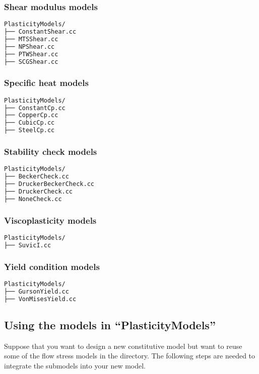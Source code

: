 \subsubsection{Shear modulus models}
\begin{lstlisting}[language=sh, backgroundcolor=\color{background}]
PlasticityModels/
├── ConstantShear.cc
├── MTSShear.cc
├── NPShear.cc
├── PTWShear.cc
├── SCGShear.cc
\end{lstlisting}

\subsubsection{Specific heat models}
\begin{lstlisting}[language=sh, backgroundcolor=\color{background}]
PlasticityModels/
├── ConstantCp.cc
├── CopperCp.cc
├── CubicCp.cc
├── SteelCp.cc
\end{lstlisting}

\subsubsection{Stability check models}
\begin{lstlisting}[language=sh, backgroundcolor=\color{background}]
PlasticityModels/
├── BeckerCheck.cc
├── DruckerBeckerCheck.cc
├── DruckerCheck.cc
├── NoneCheck.cc
\end{lstlisting}

\subsubsection{Viscoplasticity models}
\begin{lstlisting}[language=sh, backgroundcolor=\color{background}]
PlasticityModels/
├── SuvicI.cc
\end{lstlisting}

\subsubsection{Yield condition models}
\begin{lstlisting}[language=sh, backgroundcolor=\color{background}]
PlasticityModels/
├── GursonYield.cc
├── VonMisesYield.cc
\end{lstlisting}

\subsection{Using the models in ``PlasticityModels''}
Suppose that you want to design a new constitutive model 
but want to reuse some of the flow stress models in 
the  directory.
The following steps are needed to integrate the submodels into your new model.

